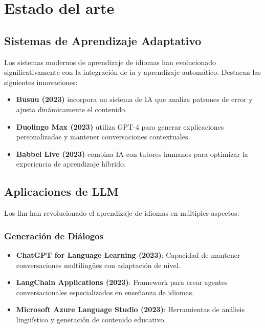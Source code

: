 \chapter{Estado del arte}
\label{estado-del-arte}

\section{Sistemas de Aprendizaje Adaptativo}
Los sistemas modernos de aprendizaje de idiomas han evolucionado significativamente con la integración de \gls{ia} y aprendizaje automático. Destacan las siguientes innovaciones:

\begin{itemize}
  \item \textbf{Busuu (2023)} incorpora un sistema de IA que analiza patrones de error y ajusta dinámicamente el contenido.

  \item \textbf{Duolingo Max (2023)} utiliza GPT-4 para generar explicaciones personalizadas y mantener conversaciones contextuales.

  \item \textbf{Babbel Live (2023)} combina IA con tutores humanos para optimizar la experiencia de aprendizaje híbrido.
\end{itemize}

\section{Aplicaciones de LLM}
Los \gls{llm} han revolucionado el aprendizaje de idiomas en múltiples aspectos:

\subsection{Generación de Diálogos}
\begin{itemize}
  \item \textbf{ChatGPT for Language Learning (2023)}: Capacidad de mantener conversaciones multilingües con adaptación de nivel.

  \item \textbf{LangChain Applications (2023)}: Framework para crear agentes conversacionales especializados en enseñanza de idiomas.

  \item \textbf{Microsoft Azure Language Studio (2023)}: Herramientas de análisis lingüístico y generación de contenido educativo.
\end{itemize}

